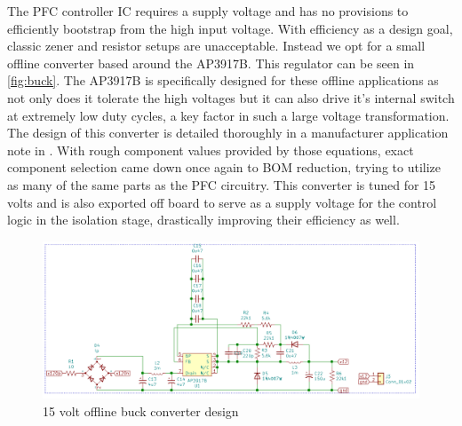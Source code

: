 \documentclass[12pt]{article}
\begin{document}
The PFC controller IC requires a supply voltage and has no provisions to efficiently bootstrap from the high input voltage. With efficiency as a design goal, classic zener and resistor setups are unacceptable. Instead we opt for a small offline converter based around the AP3917B. This regulator can be seen in \autoref{fig:buck}. The AP3917B is specifically designed for these offline applications as not only does it tolerate the high voltages but it can also drive it’s internal switch at extremely low duty cycles, a key factor in such a large voltage transformation. The design of this converter is detailed thoroughly in a manufacturer application note in \cite{7}. With rough component values provided by those equations, exact component selection came down once again to BOM reduction, trying to utilize as many of the same parts as the PFC circuitry. This converter is tuned for 15 volts and is also exported off board to serve as a supply voltage for the control logic in the isolation stage, drastically improving their efficiency as well.\\

\begin{figure}[H]
    \includegraphics[width=\textwidth]{pfcbuck}
    \caption{15 volt offline buck converter design}
    \label{fig:buck}
\end{figure}
    
\end{document}
